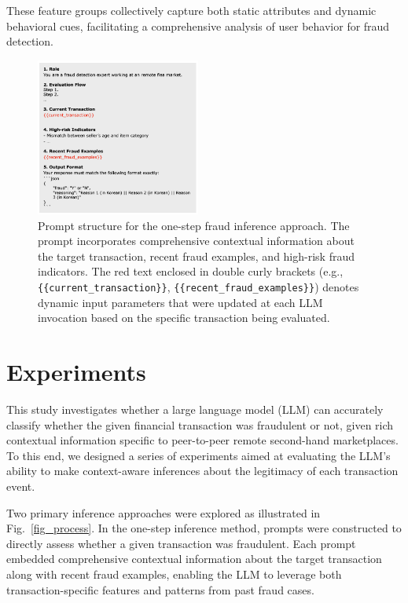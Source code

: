 \documentclass[sigconf]{acmart}
\begin{document}
These feature groups collectively capture both static attributes and dynamic behavioral cues, facilitating a comprehensive analysis of user behavior for fraud detection.




\begin{figure}[b!]
  \centering
  \includegraphics[width=0.48\textwidth]{./figures/fig_prompt_1step.png}
  \caption{Prompt structure for the one-step fraud inference approach. The prompt incorporates comprehensive contextual information about the target transaction, recent fraud examples, and high-risk fraud indicators. The red text enclosed in double curly brackets (e.g., \texttt{\{\{current\_transaction\}\}}, \texttt{\{\{recent\_fraud\_examples\}\}}) denotes dynamic input parameters that were updated at each LLM invocation based on the specific transaction being evaluated.}
\label{fig_prompt_1step}
\end{figure}



\section{Experiments}

This study investigates whether a large language model (LLM) can accurately classify whether the given financial transaction was fraudulent or not, given rich contextual information specific to peer-to-peer remote second-hand marketplaces. To this end, we designed a series of experiments aimed at evaluating the LLM’s ability to make context-aware inferences about the legitimacy of each transaction event.

Two primary inference approaches were explored as illustrated in Fig.~\ref{fig_process}. In the one-step inference method, prompts were constructed to directly assess whether a given transaction was fraudulent. Each prompt embedded comprehensive contextual information about the target transaction along with recent fraud examples, enabling the LLM to leverage both transaction-specific features and patterns from past fraud cases.
\end{document}
